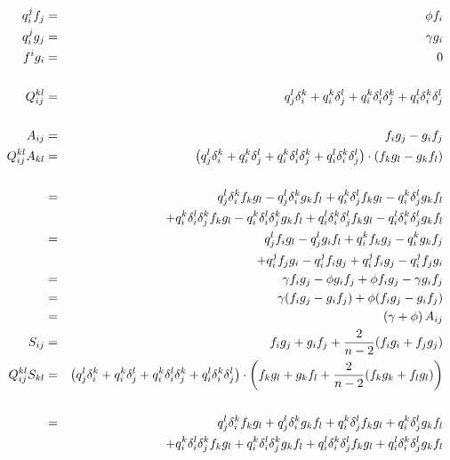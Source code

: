 \documentclass{article}
\begin{document}
\begin{eqnarray*}
  q_i^jf_j &=& \phi f_i\\
  q_i^jg_j &=& \gamma g_i\\
  f^ig_i &=& 0 \\
\\
  Q_{ij}^{kl} &=& 
        q_j^l\delta_i^k + 
        q_i^k\delta_j^l + 
        q_i^k\delta_i^l\delta_j^k +
        q_i^l\delta_i^k\delta_j^l\\
\\
  A_{ij} &=& f_ig_j - g_if_j
\\
  Q_{ij}^{kl}A_{kl} &=& 
                \left(  q_j^l\delta_i^k + 
                        q_i^k\delta_j^l + 
                        q_i^k\delta_i^l\delta_j^k +
                        q_i^l\delta_i^k\delta_j^l\right)
        \cdot  \left(f_kg_l - g_kf_l\right)\\
\\      
  &=& q_j^l\delta_i^kf_kg_l - q_j^l\delta_i^kg_kf_l + 
      q_i^k\delta_j^lf_kg_l - q_i^k\delta_j^lg_kf_l \\
      && + q_i^k\delta_i^l\delta_j^kf_kg_l - q_i^k\delta_i^l\delta_j^kg_kf_l + 
      q_i^l\delta_i^k\delta_j^lf_kg_l - q_i^l\delta_i^k\delta_j^lg_kf_l \\
  &=& q_j^lf_ig_l - q_j^lg_if_l + q_i^kf_kg_j - q_i^kg_kf_j \\
      && + q_i^jf_jg_i - q_i^jf_ig_j + q_i^jf_ig_j - q_i^jf_jg_i \\
  &=& \gamma f_ig_j - \phi g_if_j + \phi f_ig_j - \gamma g_if_j \\
  &=& \gamma (f_ig_j - g_if_j) + \phi (f_ig_j - g_if_j) \\ 
  &=& \left(\gamma + \phi\right)A_{ij}
\\
  S_{ij} &=& f_ig_j + g_if_j + {2 \over n - 2}(f_ig_i + f_jg_j)
\\
  Q_{ij}^{kl}S_{kl} &=& 
                \left(  q_j^l\delta_i^k + 
                        q_i^k\delta_j^l + 
                        q_i^k\delta_i^l\delta_j^k +
                        q_i^l\delta_i^k\delta_j^l\right)
        \cdot  \left(f_kg_l + g_kf_l + {2 \over n - 2}(f_kg_k + f_lg_l)\right)\\
\\      
  &=& q_j^l\delta_i^kf_kg_l + q_j^l\delta_i^kg_kf_l + 
      q_i^k\delta_j^lf_kg_l + q_i^k\delta_j^lg_kf_l \\
      && + q_i^k\delta_i^l\delta_j^kf_kg_l + q_i^k\delta_i^l\delta_j^kg_kf_l + 
      q_i^l\delta_i^k\delta_j^lf_kg_l + q_i^l\delta_i^k\delta_j^lg_kf_l \\

\end{eqnarray*}
\end{document}
